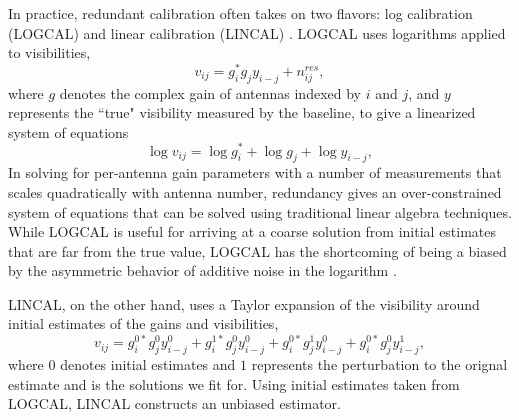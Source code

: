 \documentclass[twocolumn,numberedappendix]{emulateapj} \shorttitle{New Limits on the 21 cm Power Spectrum at $z=8.4$}
\begin{document}

In practice, redundant calibration often takes on two flavors: log calibration (LOGCAL) and
linear calibration (LINCAL) \citep{liu_et_al2010,zheng_et_al2014}. LOGCAL uses 
logarithms applied to visibilities, 
\begin{equation}
    v_{ij} = g_{i}^{\ast}g_{j}y_{i-j} + n_{ij}^{res},
\end{equation}
where $g$ denotes the complex gain of antennas indexed by $i$ and $j$, and $y$
represents the ``true" visibility measured by the baseline, to give
a linearized system of equations
\begin{equation}\label{eqn:logcal}
    \log{v_{ij}} = \log{g_{i}^{*}} + \log{g_{j}} + \log{y_{i-j}},
\end{equation}
In solving for per-antenna gain parameters with
a number of measurements that scales quadratically with antenna number, redundancy gives 
an over-constrained
system of equations that can be solved
using traditional linear algebra techniques.
While LOGCAL is useful for arriving at a coarse solution from initial estimates that are far
from the true value, LOGCAL has the shortcoming of being a biased by the asymmetric behavior
of additive noise in the logarithm \citep{liu_et_al2010}.

LINCAL, on the other hand, uses a Taylor expansion of the visibility around initial
estimates of the gains and visibilities, 
\begin{equation}\label{eqn:lincal}
v_{ij} = g_{i}^{0*}g_{j}^{0}y_{i-j}^{0} + g_{i}^{1*}g_{j}^{0}y_{i-j}^{0} +
         g_{i}^{0*}g_{j}^{1}y_{i-j}^{0}+g_{i}^{0*}g_{j}^{0}y_{i-j}^{1},
\end{equation}
where $0$ denotes initial estimates and $1$ represents the perturbation to the
orignal estimate and is the solutions we fit for.  Using initial estimates
taken from LOGCAL, LINCAL constructs an unbiased estimator.
\end{document}
